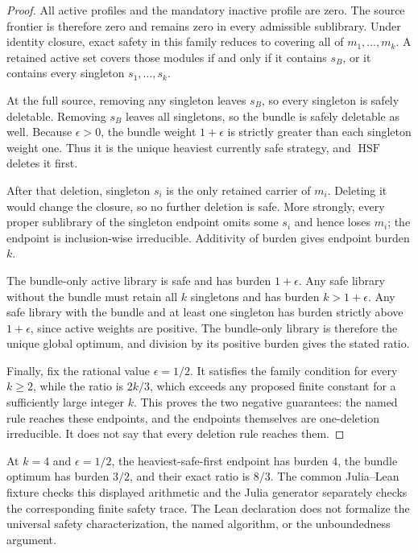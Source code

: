 \begin{proof}
All active profiles and the mandatory inactive profile are zero.  The source
frontier is therefore zero and remains zero in every admissible sublibrary.
Under identity closure, exact safety in this family reduces to covering all
of \(m_1,\ldots,m_k\).  A retained active set covers those modules if and only
if it contains \(s_B\), or it contains every singleton
\(s_1,\ldots,s_k\).

At the full source, removing any singleton leaves \(s_B\), so every
singleton is safely deletable.  Removing \(s_B\) leaves all singletons, so
the bundle is safely deletable as well.  Because \(\epsilon>0\), the bundle
weight \(1+\epsilon\) is strictly greater than each singleton weight one.
Thus it is the unique heaviest currently safe strategy, and
\(\operatorname{HSF}\) deletes it first.

After that deletion, singleton \(s_i\) is the only retained carrier of
\(m_i\).  Deleting it would change the closure, so no further deletion is
safe.  More strongly, every proper sublibrary of the singleton endpoint omits
some \(s_i\) and hence loses \(m_i\); the endpoint is inclusion-wise
irreducible.  Additivity of burden gives endpoint burden \(k\).

The bundle-only active library is safe and has burden \(1+\epsilon\).  Any
safe library without the bundle must retain all \(k\) singletons and has
burden \(k>1+\epsilon\).  Any safe library with the bundle and at least one
singleton has burden strictly above \(1+\epsilon\), since active weights are
positive.  The bundle-only library is therefore the unique global optimum,
and division by its positive burden gives the stated ratio.

Finally, fix the rational value \(\epsilon=1/2\).  It satisfies the family
condition for every \(k\geq2\), while the ratio is \(2k/3\), which exceeds
any proposed finite constant for a sufficiently large integer \(k\).  This
proves the two negative guarantees: the named rule reaches these endpoints,
and the endpoints themselves are one-deletion irreducible.  It does not say
that every deletion rule reaches them.
\end{proof}

\begin{example}
\label{ex:aor-gap-shared-formal-fixture}
At \(k=4\) and \(\epsilon=1/2\), the heaviest-safe-first endpoint has
burden \(4\), the bundle optimum has burden \(3/2\), and their exact ratio is
\(8/3\).  The common Julia--Lean fixture checks this displayed arithmetic and
the Julia generator separately checks the corresponding finite safety trace.
The Lean declaration does not formalize the universal safety characterization,
the named algorithm, or the unboundedness argument.
\end{example}

